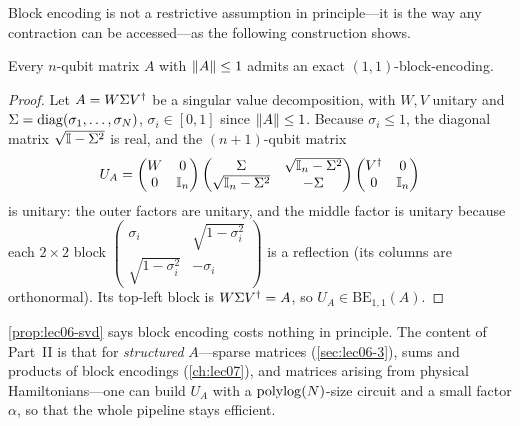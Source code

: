 Block encoding is not a restrictive assumption in principle---it is the way any
contraction can be accessed---as the following construction shows.

\begin{proposition}
\label{prop:lec06-svd}
Every $n$-qubit matrix $A$ with $\left\lVert A \right\rVert\le1$ admits an exact
$(1,1)$-block-encoding.
\end{proposition}

\begin{proof}
Let $A=W\Sigma V^{\dagger}$ be a singular value decomposition, with $W,V$ unitary and
$\Sigma=\operatorname{diag}(\sigma_1,\dots,\sigma_N)$, $\sigma_i\in[0,1]$ since $\left\lVert A \right\rVert\le1$.
Because $\sigma_i\le1$, the diagonal matrix $\sqrt{\mathbb{I}-\Sigma^2}$ is real, and the
$(n+1)$-qubit matrix
\begin{equation}
  U_A=\begin{pmatrix} W & 0\\ 0 & \mathbb{I}_n\end{pmatrix}
      \begin{pmatrix} \Sigma & \sqrt{\mathbb{I}_n-\Sigma^2}\\
                      \sqrt{\mathbb{I}_n-\Sigma^2} & -\Sigma\end{pmatrix}
      \begin{pmatrix} V^{\dagger} & 0\\ 0 & \mathbb{I}_n\end{pmatrix}
  \label{eq:lec06-svd}
\end{equation}
is unitary: the outer factors are unitary, and the middle factor is unitary because
each $2\times2$ block $\left(\begin{smallmatrix}\sigma_i&\sqrt{1-\sigma_i^2}\\
\sqrt{1-\sigma_i^2}&-\sigma_i\end{smallmatrix}\right)$ is a reflection (its columns
are orthonormal). Its top-left block is $W\Sigma V^{\dagger}=A$, so
$U_A\in\mathrm{BE}_{1,1}(A)$.
\end{proof}

\cref{prop:lec06-svd} says block encoding costs nothing in principle. The content of
Part~II is that for \emph{structured} $A$---sparse matrices (\cref{sec:lec06-3}),
sums and products of block encodings (\cref{ch:lec07}), and matrices arising from
physical Hamiltonians---one can build $U_A$ with a $\operatorname{polylog}(N)$-size circuit and a
small factor $\alpha$, so that the whole pipeline stays efficient.

